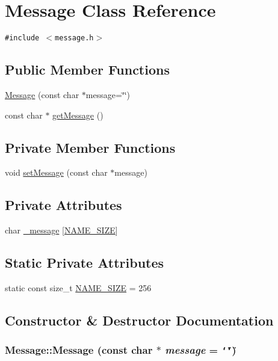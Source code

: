 \hypertarget{classMessage}{
\section{Message Class Reference}
\label{classMessage}
}
{\tt \#include $<$message.h$>$}

\subsection*{Public Member Functions}
\begin{CompactItemize}
\item 
\hyperlink{classMessage_7936e21d7668f0a84d8f7a6a699a9363}{Message} (const char $\ast$message=\char`\"{}\char`\"{})
\item 
const char $\ast$ \hyperlink{classMessage_6a450a5485d42c4df9e613c113984a47}{getMessage} ()
\end{CompactItemize}
\subsection*{Private Member Functions}
\begin{CompactItemize}
\item 
void \hyperlink{classMessage_d314fcba26617f865d67453eab4337c2}{setMessage} (const char $\ast$message)
\end{CompactItemize}
\subsection*{Private Attributes}
\begin{CompactItemize}
\item 
char \hyperlink{classMessage_249a964d400dbbac3e1e2ff3f57b4f9a}{\_\-message} \mbox{[}\hyperlink{classMessage_47c25dd0a21ab2c3b1bd8703d5f2abd9}{NAME\_\-SIZE}\mbox{]}
\end{CompactItemize}
\subsection*{Static Private Attributes}
\begin{CompactItemize}
\item 
static const size\_\-t \hyperlink{classMessage_47c25dd0a21ab2c3b1bd8703d5f2abd9}{NAME\_\-SIZE} = 256
\end{CompactItemize}


\subsection{Constructor \& Destructor Documentation}
\hypertarget{classMessage_7936e21d7668f0a84d8f7a6a699a9363}{
\subsubsection[{Message}]{\setlength{\rightskip}{0pt plus 5cm}Message::Message (const char $\ast$ {\em message} = {\tt \char`\"{}\char`\"{}})}}
\label{classMessage_7936e21d7668f0a84d8f7a6a699a9363}




